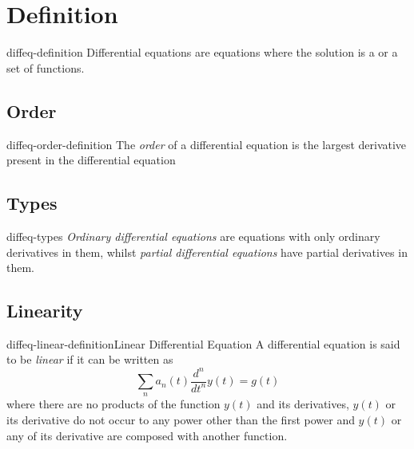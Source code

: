 \documentclass[preview]{standalone}
\begin{document}
\genpage

\section{Definition}

\begin{snippet}{diffeq-definition}
Differential equations are equations where the solution is a \function
or a set of functions.
\end{snippet}

\subsection{Order}

\begin{snippet}{diffeq-order-definition}
The \textit{order} of a differential equation is the largest derivative present in the
differential equation
\end{snippet}

\subsection{Types}

\begin{snippet}{diffeq-types}
\textit{Ordinary differential equations} are equations with only
ordinary derivatives in them, whilst \textit{partial differential equations}
have partial derivatives in them.
\end{snippet}

\subsection{Linearity}

\begin{snippetdefinition}{diffeq-linear-definition}{Linear Differential Equation}
    A differential equation is said to be \textit{linear} if it can be written as
    \[
        \sum_n a_n(t) \frac{d^n}{dt^n}y(t)=g(t)
    \]
    where there are no products of the function \(y(t)\) and its derivatives,
    \(y(t)\) or its derivative do not occur to any power other than the first power
    and \(y(t)\) or any of its derivative are composed with another function.
\end{snippetdefinition}
\end{document}
